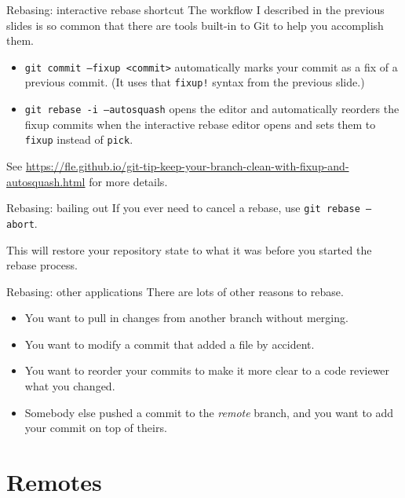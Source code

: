 \documentclass{beeper}
\begin{document}
\begin{frame}[fragile]{Rebasing: interactive rebase shortcut}
    The workflow I described in the previous slides is so common that there are
    tools built-in to Git to help you accomplish them.

    \begin{itemize}
        \item \texttt{git commit --fixup <commit>} automatically marks your
            commit as a fix of a previous commit. (It uses that \texttt{fixup!}
            syntax from the previous slide.)

        \item \texttt{git rebase -i --autosquash} opens the editor and
            automatically reorders the fixup commits when the interactive rebase
            editor opens and sets them to \texttt{fixup} instead of
            \texttt{pick}.
    \end{itemize}

    See
    \url{https://fle.github.io/git-tip-keep-your-branch-clean-with-fixup-and-autosquash.html}
    for more details.
\end{frame}

\begin{frame}{Rebasing: bailing out}
    If you ever need to cancel a rebase, use \texttt{git rebase --abort}.

    This will restore your repository state to what it was before you started
    the rebase process.
\end{frame}

\begin{frame}{Rebasing: other applications}
    There are lots of other reasons to rebase.
    \begin{itemize}
        \item You want to pull in changes from another branch without merging.
        \item You want to modify a commit that added a file by accident.
        \item You want to reorder your commits to make it more clear to a code
            reviewer what you changed.
        \item Somebody else pushed a commit to the \textit{remote} branch, and
            you want to add your commit on top of theirs.
    \end{itemize}
\end{frame}

\section{Remotes}
\end{document}
